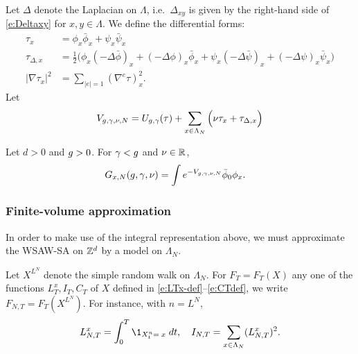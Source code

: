 Let $\Delta$ denote the Laplacian on $\Lambda$,
i.e.\ $\Delta_{xy}$ is given by the right-hand side of
\eqref{e:Deltaxy} for $x, y \in \Lambda$.
We define the differential forms:
\begin{align}
\label{e:taudef}
\tau_x
	&=
\phi_x \bar\phi_x + \psi_x \bar\psi_x
	\\
\label{e:addDelta}
\tau_{\Delta,x}
	&=
\frac 12
\Big(
	\phi_{x} (- \Delta \bar{\phi})_{x} + (- \Delta \phi)_{x} \bar{\phi}_{x}
		+
	\psi_{x}  (- \Delta \bar{\psi})_{x} + (- \Delta \psi)_{x}  \bar{\psi}_{x}
\Big)
	\\
\label{e:nablatau}
|\nabla \tau_x|^2
	&=
\sum_{|e|=1} (\nabla^e \tau)_x^2.
\end{align}
Let
\begin{equation}
\label{e:Vdef2}
V_{g,\gamma,\nu,N}
	=
U_{g,\gamma}(\tau)
	+
\sum_{x\in\Lambda_N}
\Big(
	\nu \tau_x + \tau_{\Delta,x}
\Big)
\end{equation}

\begin{prop}
Let $d > 0$ and $g > 0$. For $\gamma < g$ and $\nu \in {\mathbb R}$,
\begin{align}
\label{e:Grep-pos-bis}
G_{x,N}(g, \gamma, \nu)
	&=
\int e^{-V_{g,\gamma,\nu,N}} \bar\phi_0 \phi_x.
\end{align}
\end{prop}

\subsubsection{Finite-volume approximation}

In order to make use of the integral representation above, we must approximate the
WSAW-SA on ${ {{\mathbb Z}}^d }$ by a model on $\Lambda_N$.

Let $X^{L^N}$ denote the simple random walk on $\Lambda_N$.
For $F_T = F_T(X)$ any one of the functions $L_T^x,I_T,C_T$
of $X$ defined in \eqref{e:LTx-def}--\eqref{e:CTdef},
we write $F_{N,T} = F_T(X^{L^N})$. For instance, with $n=L^N$,
\begin{equation}
    L^x_{N,T} = \int_0^T \1_{X^{n}_t=\;x} \; dt,
    \quad I_{N,T} = \sum_{x \in \Lambda_N}(L_{N,T}^x)^2 .
\end{equation}

